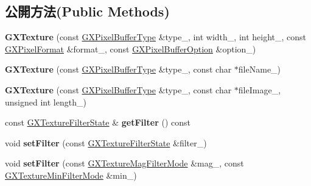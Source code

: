 \subsection*{公開方法(Public Methods)}
\begin{DoxyCompactItemize}
\item 
{\bfseries G\+X\+Texture} (const \hyperlink{class_magnum_1_1_g_x_pixel_buffer_type}{G\+X\+Pixel\+Buffer\+Type} \&type\+\_\+, int width\+\_\+, int height\+\_\+, const \hyperlink{class_magnum_1_1_g_x_pixel_format}{G\+X\+Pixel\+Format} \&format\+\_\+, const \hyperlink{class_magnum_1_1_g_x_pixel_buffer_option}{G\+X\+Pixel\+Buffer\+Option} \&option\+\_\+)\hypertarget{class_magnum_1_1_g_x_texture_ac71b7bf644cc587e2eeb30720365fb50}{}\label{class_magnum_1_1_g_x_texture_ac71b7bf644cc587e2eeb30720365fb50}

\item 
{\bfseries G\+X\+Texture} (const \hyperlink{class_magnum_1_1_g_x_pixel_buffer_type}{G\+X\+Pixel\+Buffer\+Type} \&type\+\_\+, const char $\ast$file\+Name\+\_\+)\hypertarget{class_magnum_1_1_g_x_texture_a15b2ed9511c21d54181cfffdc06b51b4}{}\label{class_magnum_1_1_g_x_texture_a15b2ed9511c21d54181cfffdc06b51b4}

\item 
{\bfseries G\+X\+Texture} (const \hyperlink{class_magnum_1_1_g_x_pixel_buffer_type}{G\+X\+Pixel\+Buffer\+Type} \&type\+\_\+, const char $\ast$file\+Image\+\_\+, unsigned int length\+\_\+)\hypertarget{class_magnum_1_1_g_x_texture_aad4a0297c63302975ce8bc36e0c44f7f}{}\label{class_magnum_1_1_g_x_texture_aad4a0297c63302975ce8bc36e0c44f7f}

\item 
const \hyperlink{class_magnum_1_1_g_x_texture_filter_state}{G\+X\+Texture\+Filter\+State} \& {\bfseries get\+Filter} () const \hypertarget{class_magnum_1_1_g_x_texture_a2aee96ff1130b727139212b469388211}{}\label{class_magnum_1_1_g_x_texture_a2aee96ff1130b727139212b469388211}

\item 
void {\bfseries set\+Filter} (const \hyperlink{class_magnum_1_1_g_x_texture_filter_state}{G\+X\+Texture\+Filter\+State} \&filter\+\_\+)\hypertarget{class_magnum_1_1_g_x_texture_ac12240c8cbe3f0d43ca0c3c880184de8}{}\label{class_magnum_1_1_g_x_texture_ac12240c8cbe3f0d43ca0c3c880184de8}

\item 
void {\bfseries set\+Filter} (const \hyperlink{class_magnum_1_1_g_x_texture_mag_filter_mode}{G\+X\+Texture\+Mag\+Filter\+Mode} \&mag\+\_\+, const \hyperlink{class_magnum_1_1_g_x_texture_min_filter_mode}{G\+X\+Texture\+Min\+Filter\+Mode} \&min\+\_\+)\hypertarget{class_magnum_1_1_g_x_texture_a111f659ac93966b8b0eff4814e749012}{}\label{class_magnum_1_1_g_x_texture_a111f659ac93966b8b0eff4814e749012}


\end{DoxyCompactItemize}
